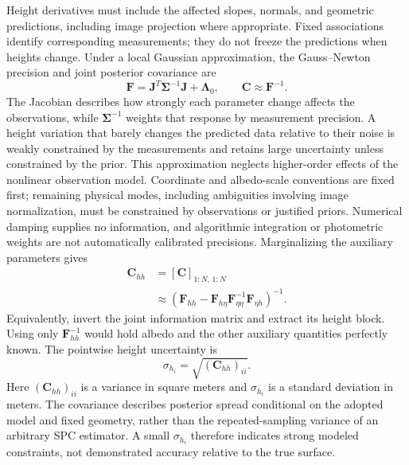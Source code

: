 Height derivatives must include the affected slopes, normals, and geometric predictions, including image projection where appropriate. Fixed associations identify corresponding measurements; they do not freeze the predictions when heights change. Under a local Gaussian approximation, the Gauss--Newton precision and joint posterior covariance are
\begin{equation}
    \mathbf F=\mathbf J^T\boldsymbol\Sigma^{-1}\mathbf J
                 +\boldsymbol\Lambda_0,
    \qquad
    \mathbf C\approx\mathbf F^{-1}.
    \label{eq:uncertainty-information}
\end{equation}
The Jacobian describes how strongly each parameter change affects the observations, while $\boldsymbol\Sigma^{-1}$ weights that response by measurement precision. A height variation that barely changes the predicted data relative to their noise is weakly constrained by the measurements and retains large uncertainty unless constrained by the prior. This approximation neglects higher-order effects of the nonlinear observation model. Coordinate and albedo-scale conventions are fixed first; remaining physical modes, including ambiguities involving image normalization, must be constrained by observations or justified priors. Numerical damping supplies no information, and algorithmic integration or photometric weights are not automatically calibrated precisions.
Marginalizing the auxiliary parameters gives
\begin{equation}
    \begin{aligned}
        \mathbf C_{hh}&=[\mathbf C]_{1:N,\,1:N}\\
        &\approx(\mathbf F_{hh}-\mathbf F_{h\eta}
          \mathbf F_{\eta\eta}^{-1}\mathbf F_{\eta h})^{-1}.
    \end{aligned}
    \label{eq:uncertainty-height-covariance}
\end{equation}
Equivalently, invert the joint information matrix and extract its height block. Using only $\mathbf F_{hh}^{-1}$ would hold albedo and the other auxiliary quantities perfectly known. The pointwise height uncertainty is
\begin{equation}
    \sigma_{h_i}=\sqrt{(\mathbf C_{hh})_{ii}}.
    \label{eq:uncertainty-pointwise-height}
\end{equation}
Here $(\mathbf C_{hh})_{ii}$ is a variance in square meters and $\sigma_{h_i}$ is a standard deviation in meters. The covariance describes posterior spread conditional on the adopted model and fixed geometry, rather than the repeated-sampling variance of an arbitrary SPC estimator. A small $\sigma_{h_i}$ therefore indicates strong modeled constraints, not demonstrated accuracy relative to the true surface.
